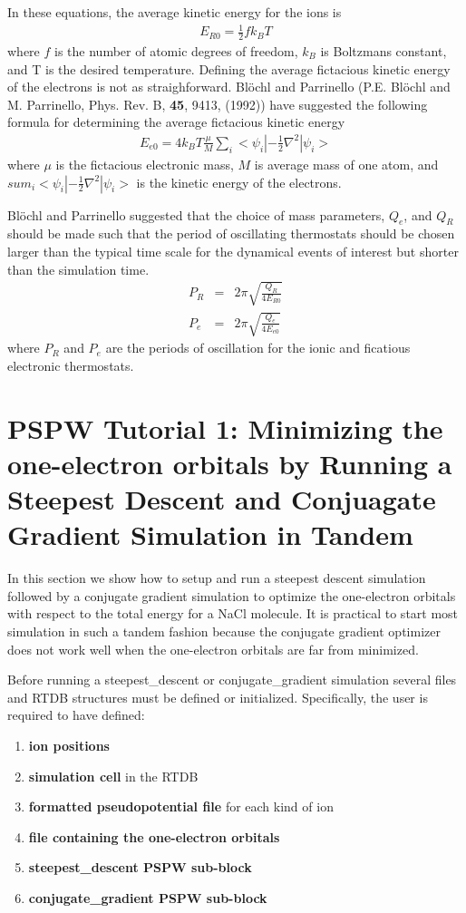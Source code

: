 In these equations, the average kinetic energy for the ions is
\begin{eqnarray}
E_{R0} = \frac{1}{2} f k_B T
\end{eqnarray}
where $f$ is the number of atomic degrees of freedom, $k_B$ is 
Boltzmans constant, and T is the desired temperature.  Defining
the average fictacious kinetic energy of the electrons is not as straighforward.
Bl\"{o}chl and Parrinello 
(P.E. Bl\"{o}chl and M. Parrinello, Phys. Rev. B, \textbf{45}, 9413, (1992)) 
have suggested the following formula for determining
the average fictacious kinetic energy
\begin{eqnarray}
E_{e0} = 4 k_B T \frac{\mu}{M} \sum_i <\psi_i|-\frac{1}{2} \nabla^2 |\psi_i>
\end{eqnarray}
where $\mu$ is the fictacious electronic mass, $M$ is average mass of one atom,
and $sum_i <\psi_i|-\frac{1}{2} \nabla^2 |\psi_i>$ is the kinetic energy of the
electrons.

Bl\"{o}chl and Parrinello suggested that the choice of mass parameters, 
$Q_e$, and $Q_R$ should be made such that the period of oscillating thermostats 
should be chosen larger than the typical time scale for the dynamical events of 
interest but shorter than the simulation time.  
\begin{eqnarray}
P_R &=& 2\pi \sqrt{\frac{Q_R}{4E_{R0}}}\\
P_e &=& 2\pi \sqrt{\frac{Q_e}{4E_{e0}}}
\end{eqnarray}
where $P_R$ and $P_e$ are the periods of oscillation for the ionic and ficatious
electronic thermostats.  




\section{PSPW Tutorial 1: Minimizing the one-electron orbitals by Running a Steepest Descent and Conjuagate Gradient Simulation in Tandem}
\label{sec:pspw_sd}

In this section we show how to setup and run a steepest descent
simulation followed by a conjugate gradient simulation to optimize 
the one-electron orbitals with respect to 
the total energy for a NaCl molecule.  It is practical to
start most simulation in such a tandem fashion because the
conjugate gradient optimizer does not work well when the
one-electron orbitals are far from minimized. 

Before running a steepest\_descent or conjugate\_gradient simulation several files and
RTDB structures must be defined or initialized.  Specifically, the user 
is required to have defined:
\begin{enumerate}
  \item {\bf ion positions} 
  \item {\bf simulation cell} in the RTDB 
  \item {\bf formatted pseudopotential file} for each kind of ion 
  \item {\bf file containing the one-electron orbitals} 
  \item {\bf steepest\_descent PSPW sub-block} 
  \item {\bf conjugate\_gradient PSPW sub-block}
\end{enumerate}

